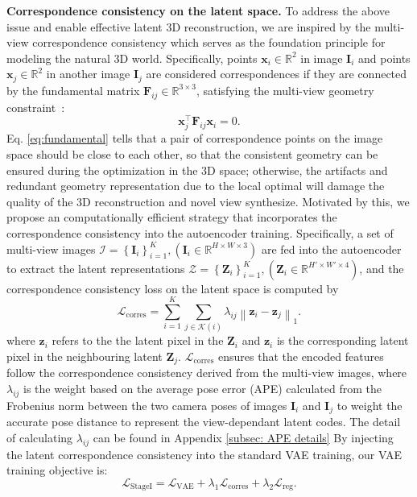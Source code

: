 \noindent\textbf{Correspondence consistency on the latent space.}
To address the above issue and enable effective latent 3D reconstruction, we are inspired by the multi-view correspondence consistency which serves as the foundation principle for modeling the natural 3D world. Specifically, points $\boldsymbol{x}_i \in \mathbb{R}^{2}$ in image $\boldsymbol{I}_i$ and points $\boldsymbol{x}_j \in \mathbb{R}^{2}$ in another image $\boldsymbol{I}_j$ are considered correspondences if they are connected by the fundamental matrix $\boldsymbol{F}_{ij} \in \mathbb{R}^{3 \times 3}$, satisfying the multi-view geometry constraint~\citep{schoenberger2016sfm}:
\begin{equation}
\boldsymbol{x}_{j}^\top \boldsymbol{F}_{ij} \boldsymbol{x}_i = 0.
\label{eq:fundamental}
\end{equation}
Eq. \ref{eq:fundamental} tells that a pair of correspondence points on the image space should be close to each other, so that the consistent geometry can be ensured during the optimization in the 3D space; otherwise, the artifacts and redundant geometry representation due to the local optimal will damage the quality of the 3D reconstruction and novel view synthesize. 
Motivated by this, we propose an computationally efficient strategy that incorporates the correspondence consistency into the autoencoder training. 
Specifically, a set of multi-view images $\mathcal{I}=\left\{\boldsymbol{I}_i\right\}_{i=1}^K,\left(\boldsymbol{I}_i \in \mathbb{R}^{H \times W \times 3}\right)$ are fed into the autoencoder to extract the latent representations  $\mathcal{Z}=\left\{\boldsymbol{Z}_i\right\}_{i=1}^K,\left(\boldsymbol{Z}_i \in \mathbb{R}^{H' \times W '\times 4}\right)$, and the correspondence consistency loss on the latent space is computed by 
\begin{equation}
\mathcal{L}_{\text{corres}} =  \sum_{i=1}^{K} \sum_{j \in \mathcal{K}(i)} \lambda_{ij} \left\| \boldsymbol{z}_i - \boldsymbol{z}_j \right\|_1.
\end{equation}
where $\boldsymbol{z}_i$ refers to the the latent pixel in the $\boldsymbol{Z}_i$ and $\boldsymbol{z}_i$ is the corresponding latent pixel in the neighbouring latent  $\boldsymbol{Z}_j$.
$\mathcal{L}_{\text{corres}}$ ensures that the encoded features follow the correspondence consistency derived from the multi-view images, where $\lambda_{ij}$ is the weight based on the average pose error (APE) calculated from the Frobenius norm between the two camera poses of images $\boldsymbol{I}_i$ and $\boldsymbol{I}_j$ to weight the accurate pose distance to represent the view-dependant latent codes. The detail of calculating $\lambda_{ij}$ can be found in Appendix \ref{subsec: APE details}
By injecting the latent correspondence consistency into the standard VAE training, our VAE training objective is: 
\begin{equation} 
\mathcal{L}_\text{StageI} =\mathcal{L}_\text{VAE} + \lambda_{1}\mathcal{L}_{\text{corres}} + \lambda_{2}\mathcal{L}_{\text{reg}}.
\label{eq:encoder}
\end{equation}

